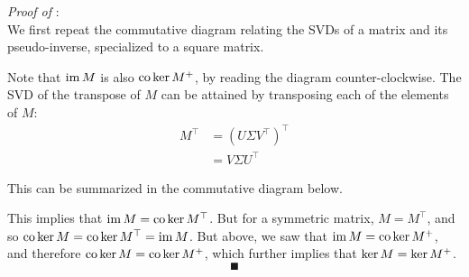 \documentclass[../../thesis.tex]{subfiles}
\begin{document}
\noindent \textit{Proof of }:\\
We first repeat the commutative diagram
relating the SVDs of a matrix and its pseudo-inverse,
specialized to a square matrix.

\begin{center}
\end{center}

Note that $\operatorname*{im} M$ is also $\operatorname*{co}\ker M^{+}$,
by reading the diagram counter-clockwise.
The SVD of the transpose of $M$
can be attained by transposing each of the elements of $M$:
\begin{align}
	M^\top
	&= {\left(U \Sigma V^\top\right)}^\top\\
	&= V \Sigma U^\top
\end{align}

This can be summarized in the commutative diagram below.

\begin{center}
\end{center}

This implies that $\operatorname*{im} M = \operatorname*{co}\ker M^\top$.
But for a symmetric matrix,
$M = M^\top$,
and so $\operatorname*{co}\ker M = \operatorname*{co}\ker M^\top = \operatorname*{im} M$.
But above, we saw that $\operatorname*{im} M = \operatorname*{co}\ker M^{+}$,
and therefore $\operatorname*{co}\ker M = \operatorname*{co}\ker M^{+}$,
which further implies that $\ker M = \ker M^{+}$.
\[\QED\]
\end{document}
